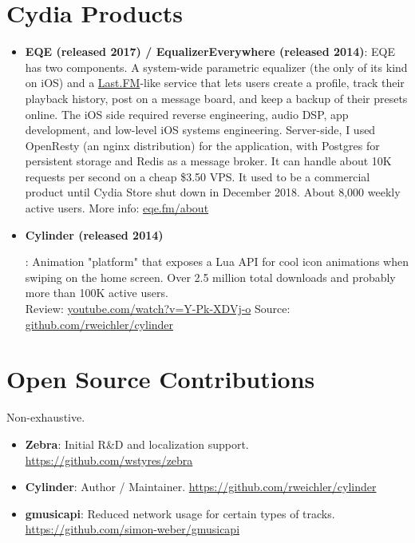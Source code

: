 \documentclass[letterpaper,11pt]{article}
\newcommand{\resumeItem}[2]{
  \item\small{
    \textbf{#1}{: #2 \vspace{-2.5pt}}
  }
}
\newcommand{\resumeSubItem}[2]{\resumeItem{#1}{#2}\vspace{-4.5pt}}
\newcommand{\resumeSubHeadingListStart}{\begin{itemize}[leftmargin=*]}
\newcommand{\resumeSubHeadingListEnd}{\end{itemize}}
\begin{document}
\section{Cydia Products}
  \resumeSubHeadingListStart
    \resumeSubItem{EQE (released 2017) / EqualizerEverywhere (released 2014)}{EQE has two components. A system-wide parametric equalizer (the only of its kind on iOS) and a  \href{https://last.fm}{Last.FM}-like service that lets users create a profile, track their playback history, post on a message board, and keep a backup of their presets online. The iOS side required reverse engineering, audio DSP, app development, and low-level iOS systems engineering. Server-side, I used OpenResty (an nginx distribution) for the application, with Postgres for persistent storage and Redis as a message broker. It can handle about 10K requests per second on a cheap \$3.50 VPS. It used to be a commercial product until Cydia Store shut down in December 2018. About 8,000 weekly active users. More info: \href{https://eqe.fm/about}{eqe.fm/about} }
    \resumeSubItem{Cylinder (released 2014)}{Animation "platform" that exposes a Lua API for cool icon animations when swiping on the home screen. Over 2.5 million total downloads and probably more than 100K active users. \\ Review: \href{https://youtube.com/watch?v=Y-Pk-XDVj-o}{youtube.com/watch?v=Y-Pk-XDVj-o}
    Source: \href{https://github.com/rweichler/cylinder}{github.com/rweichler/cylinder}
    
    }
  \resumeSubHeadingListEnd
  
\section{Open Source Contributions}
  Non-exhaustive.\vspace{-2pt}
  \resumeSubHeadingListStart
    \resumeSubItem{Zebra}
      {Initial R\&D and localization support. \href{https://github.com/wstyres/zebra}{https://github.com/wstyres/zebra}}
    \resumeSubItem{Cylinder}
      {Author / Maintainer. \href{https://github.com/rweichler/cylinde}{https://github.com/rweichler/cylinder}}
    \resumeSubItem{gmusicapi}
      {Reduced network usage for certain types of tracks. \href{https://github.com/simon-weber/gmusicapi}{https://github.com/simon-weber/gmusicapi}}
      
  \resumeSubHeadingListEnd

\end{document}
